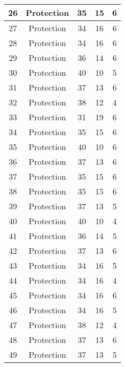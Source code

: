 \documentclass[results.tex]{subfiles}
\begin{document}
\begin{center}
\begin{tabular}{| c || c | c | c | c |}
    \hline
    26 & Protection & 35 & 15 & 6 \\ 
    \hline
    27 & Protection & 34 & 16 & 6 \\ 
    \hline
    28 & Protection & 34 & 16 & 6 \\ 
    \hline
    29 & Protection & 36 & 14 & 6 \\ 
    \hline
    30 & Protection & 40 & 10 & 5 \\ 
    \hline
    31 & Protection & 37 & 13 & 6 \\ 
    \hline
    32 & Protection & 38 & 12 & 4 \\ 
    \hline
    33 & Protection & 31 & 19 & 6 \\ 
    \hline
    34 & Protection & 35 & 15 & 6 \\ 
    \hline
    35 & Protection & 40 & 10 & 6 \\ 
    \hline
    36 & Protection & 37 & 13 & 6 \\ 
    \hline
    37 & Protection & 35 & 15 & 6 \\ 
    \hline
    38 & Protection & 35 & 15 & 6 \\ 
    \hline
    39 & Protection & 37 & 13 & 5 \\ 
    \hline
    40 & Protection & 40 & 10 & 4 \\ 
    \hline
    41 & Protection & 36 & 14 & 5 \\ 
    \hline
    42 & Protection & 37 & 13 & 6 \\ 
    \hline
    43 & Protection & 34 & 16 & 5 \\ 
    \hline
    44 & Protection & 34 & 16 & 4 \\ 
    \hline
    45 & Protection & 34 & 16 & 6 \\ 
    \hline
    46 & Protection & 34 & 16 & 5 \\ 
    \hline
    47 & Protection & 38 & 12 & 4 \\ 
    \hline
    48 & Protection & 37 & 13 & 6 \\ 
    \hline
    49 & Protection & 37 & 13 & 5 \\ 
    \hline   \end{tabular}
\end{center}
\end{document}
